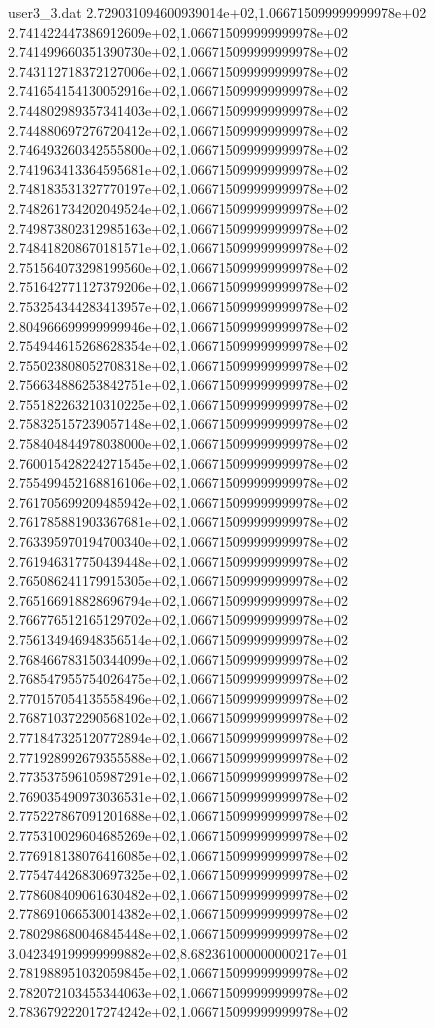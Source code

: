 \begin{filecontents}{user3_3.dat}
2.729031094600939014e+02,1.066715099999999978e+02
2.741422447386912609e+02,1.066715099999999978e+02
2.741499660351390730e+02,1.066715099999999978e+02
2.743112718372127006e+02,1.066715099999999978e+02
2.741654154130052916e+02,1.066715099999999978e+02
2.744802989357341403e+02,1.066715099999999978e+02
2.744880697276720412e+02,1.066715099999999978e+02
2.746493260342555800e+02,1.066715099999999978e+02
2.741963413364595681e+02,1.066715099999999978e+02
2.748183531327770197e+02,1.066715099999999978e+02
2.748261734202049524e+02,1.066715099999999978e+02
2.749873802312985163e+02,1.066715099999999978e+02
2.748418208670181571e+02,1.066715099999999978e+02
2.751564073298199560e+02,1.066715099999999978e+02
2.751642771127379206e+02,1.066715099999999978e+02
2.753254344283413957e+02,1.066715099999999978e+02
2.804966699999999946e+02,1.066715099999999978e+02
2.754944615268628354e+02,1.066715099999999978e+02
2.755023808052708318e+02,1.066715099999999978e+02
2.756634886253842751e+02,1.066715099999999978e+02
2.755182263210310225e+02,1.066715099999999978e+02
2.758325157239057148e+02,1.066715099999999978e+02
2.758404844978038000e+02,1.066715099999999978e+02
2.760015428224271545e+02,1.066715099999999978e+02
2.755499452168816106e+02,1.066715099999999978e+02
2.761705699209485942e+02,1.066715099999999978e+02
2.761785881903367681e+02,1.066715099999999978e+02
2.763395970194700340e+02,1.066715099999999978e+02
2.761946317750439448e+02,1.066715099999999978e+02
2.765086241179915305e+02,1.066715099999999978e+02
2.765166918828696794e+02,1.066715099999999978e+02
2.766776512165129702e+02,1.066715099999999978e+02
2.756134946948356514e+02,1.066715099999999978e+02
2.768466783150344099e+02,1.066715099999999978e+02
2.768547955754026475e+02,1.066715099999999978e+02
2.770157054135558496e+02,1.066715099999999978e+02
2.768710372290568102e+02,1.066715099999999978e+02
2.771847325120772894e+02,1.066715099999999978e+02
2.771928992679355588e+02,1.066715099999999978e+02
2.773537596105987291e+02,1.066715099999999978e+02
2.769035490973036531e+02,1.066715099999999978e+02
2.775227867091201688e+02,1.066715099999999978e+02
2.775310029604685269e+02,1.066715099999999978e+02
2.776918138076416085e+02,1.066715099999999978e+02
2.775474426830697325e+02,1.066715099999999978e+02
2.778608409061630482e+02,1.066715099999999978e+02
2.778691066530014382e+02,1.066715099999999978e+02
2.780298680046845448e+02,1.066715099999999978e+02
3.042349199999999882e+02,8.682361000000000217e+01
2.781988951032059845e+02,1.066715099999999978e+02
2.782072103455344063e+02,1.066715099999999978e+02
2.783679222017274242e+02,1.066715099999999978e+02

\end{filecontents}
